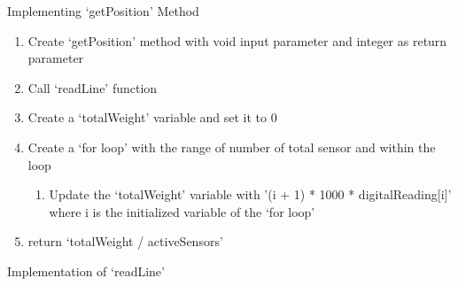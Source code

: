 \documentclass{beamer}
\begin{document}
	
	\begin{frame}{Implementing `getPosition' Method}
	
	\begin{enumerate}
		
		\item{Create `getPosition' method with void input parameter and integer as return parameter}
		
		\item{Call `readLine' function}
		
		\item{Create a `totalWeight' variable and set it to 0}
		
		\item{Create a `for loop' with the range of number of total sensor and within the loop 
		
			\begin{enumerate}
			
				\item{Update the `totalWeight' variable with '(i + 1) * 1000 * digitalReading[i]' where i is the initialized variable of the `for loop'}
							
			
\end{enumerate}	

}

	\item{return `totalWeight / activeSensors'}				
		
	\end{enumerate}
	
	\end{frame}
	
	
	

	\begin{frame}[allowframebreaks]{Implementation of `readLine'} 
	
	\readLine
	
	
	\end{frame}
	
\end{document}
